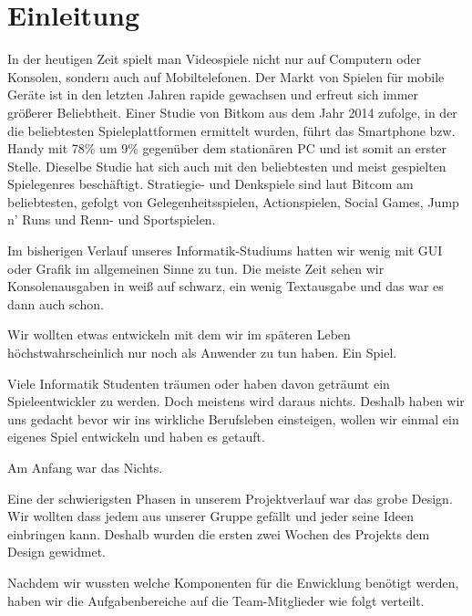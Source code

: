 \chapter{Einleitung}\label{ch:intro}

\label{sec:1_Ausgangssituation}

In der heutigen Zeit spielt man Videospiele nicht nur auf Computern oder Konsolen, sondern auch auf Mobiltelefonen. Der Markt von Spielen für mobile Geräte ist in den letzten Jahren rapide gewachsen und erfreut sich immer größerer Beliebtheit. Einer Studie von Bitkom \cite{bitkomgaming} aus dem Jahr 2014 zufolge, in der die beliebtesten Spieleplattformen ermittelt wurden, führt das Smartphone bzw. Handy mit 78\% um 9\% gegenüber dem stationären PC und ist somit an erster Stelle. Dieselbe Studie hat sich auch mit den beliebtesten und meist gespielten Spielegenres beschäftigt. Stratiegie- und Denkspiele sind laut Bitcom am beliebtesten, gefolgt von Gelegenheitsspielen, Actionspielen, Social Games, Jump n' Runs und Renn- und Sportspielen.




\label{sec:1_Motivation}

Im bisherigen Verlauf unseres Informatik-Studiums hatten wir wenig mit GUI oder Grafik im allgemeinen Sinne zu tun. Die meiste Zeit sehen wir Konsolenausgaben in weiß auf schwarz, ein wenig Textausgabe und das war es dann auch schon. 

Wir wollten etwas entwickeln mit dem wir im späteren Leben höchstwahrscheinlich nur noch als Anwender zu tun haben. Ein Spiel. 

Viele Informatik Studenten träumen oder haben davon geträumt ein Spieleentwickler zu werden. Doch meistens wird daraus nichts. Deshalb haben wir uns gedacht bevor wir ins wirkliche Berufsleben einsteigen, wollen wir einmal ein eigenes Spiel entwickeln und haben es \gamename getauft.


\newpage
{}\label{sec:1_Vorgehen}

Am Anfang war das Nichts.

Eine der schwierigsten Phasen in unserem Projektverlauf war das grobe Design. Wir wollten dass  \gamename jedem aus unserer Gruppe gefällt und jeder seine Ideen einbringen kann. Deshalb wurden die ersten zwei Wochen des Projekts dem Design gewidmet. 

Nachdem wir wussten welche Komponenten für die Enwicklung benötigt werden, haben wir die Aufgabenbereiche auf die Team-Mitglieder wie folgt verteilt.

